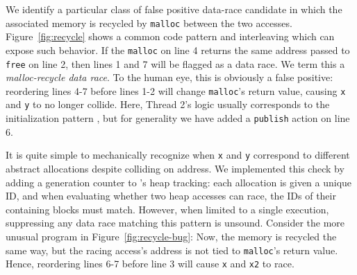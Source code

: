 We identify a particular class of false positive data-race candidate in which the associated memory is recycled by {\tt malloc} between the two accesses.
Figure~\ref{fig:recycle} shows a common code pattern and interleaving which can expose such behavior.
If the {\tt malloc} on line 4 returns the same address passed to {\tt free} on line 2, then lines 1 and 7 will be flagged as a data race.
We term this a {\em malloc-recycle data race}.
To the human eye, this is obviously a false positive: reordering lines 4-7 before lines 1-2 will change {\tt malloc}'s return value, causing {\tt x} and {\tt y} to no longer collide.
Here, Thread 2's logic usually corresponds to the initialization pattern \cite{eraser}, but for generality we have added a {\tt publish} action on line 6.


It is quite simple to mechanically recognize when {\tt x} and {\tt y} correspond to different abstract allocations despite colliding on address.
We implemented this check by adding a generation counter to \landslide's heap tracking:
each allocation is given a unique ID,
and when evaluating whether two heap accesses can race,
the IDs of their containing blocks must match.
However, when limited to a single execution, suppressing any data race matching this pattern is unsound.
Consider the more unusual program in Figure~\ref{fig:recycle-bug}:
Now, the memory is recycled the same way, but the racing access's address is not tied to {\tt malloc}'s return value.
Hence, reordering lines 6-7 before line 3 will cause {\tt x} and {\tt x2} to race.

